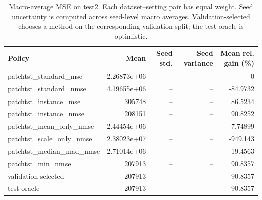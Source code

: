 \begin{table}[htbp]
\centering
\caption{Macro-average MSE on test2. Each dataset--setting pair has equal weight. Seed uncertainty is computed across seed-level macro averages. Validation-selected chooses a method on the corresponding validation split; the test oracle is optimistic.}
\begin{tabular}{lrrrr}
\toprule
Policy & Mean & Seed std. & Seed variance & Mean rel. gain (\%) \\
\midrule
patchtst\_standard\_mse & 2.26873e+06 & -- & -- & 0 \\
patchtst\_standard\_nmse & 4.19655e+06 & -- & -- & -84.9732 \\
patchtst\_instance\_mse & 305748 & -- & -- & 86.5234 \\
patchtst\_instance\_nmse & 208151 & -- & -- & 90.8252 \\
patchtst\_mean\_only\_nmse & 2.44454e+06 & -- & -- & -7.74899 \\
patchtst\_scale\_only\_nmse & 2.38023e+07 & -- & -- & -949.143 \\
patchtst\_median\_mad\_nmse & 2.71014e+06 & -- & -- & -19.4563 \\
patchtst\_min\_nmse & 207913 & -- & -- & 90.8357 \\
validation-selected & 207913 & -- & -- & 90.8357 \\
\midrule
test-oracle & 207913 & -- & -- & 90.8357 \\
\bottomrule
\end{tabular}
\end{table}
